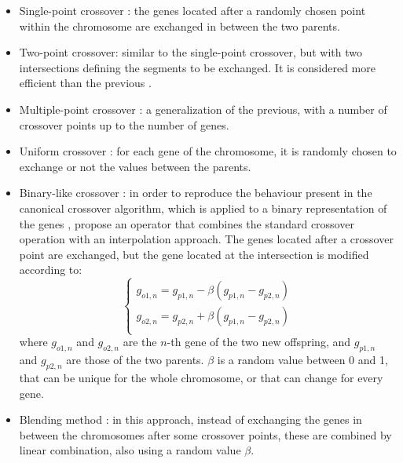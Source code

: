 \documentclass{ametsoc}
\begin{document}
\begin{itemize}
	\item Single-point crossover \citep{Goldberg1989}: the genes located after a randomly chosen point within the chromosome are exchanged in between the two parents.
	
	\item Two-point crossover: similar to the single-point crossover, but with two intersections defining the segments to be exchanged. It is considered more efficient than the previous \citep{Beasley1993a}.
	
	\item Multiple-point crossover \citep{DeJong1975a}: a generalization of the previous, with a number of crossover points up to the number of genes.
	
	\item Uniform crossover \citep{Syswerda1989}: for each gene of the chromosome, it is randomly chosen to exchange or not the values between the parents.
	
	\item Binary-like crossover \citep{Haupt2004}: in order to reproduce the behaviour present in the canonical crossover algorithm, which is applied to a binary representation of the genes \citep{Goldberg1989, Goldberg1990a, Herrera1998a}, \citet{Haupt2004} propose an operator that combines the standard crossover operation with an interpolation approach. The genes located after a crossover point are exchanged, but the gene located at the intersection is modified according to:
	\begin{equation}
	\left\lbrace \begin{array}{l} 
	g_{o1,n} = g_{p1,n} - \beta (g_{p1,n} - g_{p2,n}) \\
	g_{o2,n} = g_{p2,n} + \beta (g_{p1,n} - g_{p2,n}) \\
	\end{array} \right.
	\label{eq:binary_like_crossover}
	\end{equation}
	where $g_{o1,n}$ and $g_{o2,n}$ are the $n$-th gene of the two new offspring, and $g_{p1,n}$ and $g_{p2,n}$ are those of the two parents. $\beta$ is a random value between 0 and 1, that can be unique for the whole chromosome, or that can change for every gene.
	
	\item Blending method \citep{Radcliffe1991a}: in this approach, instead of exchanging the genes in between the chromosomes after some crossover points, these are combined by linear combination, also using a random value $\beta$.
	

\end{itemize}
\end{document}
